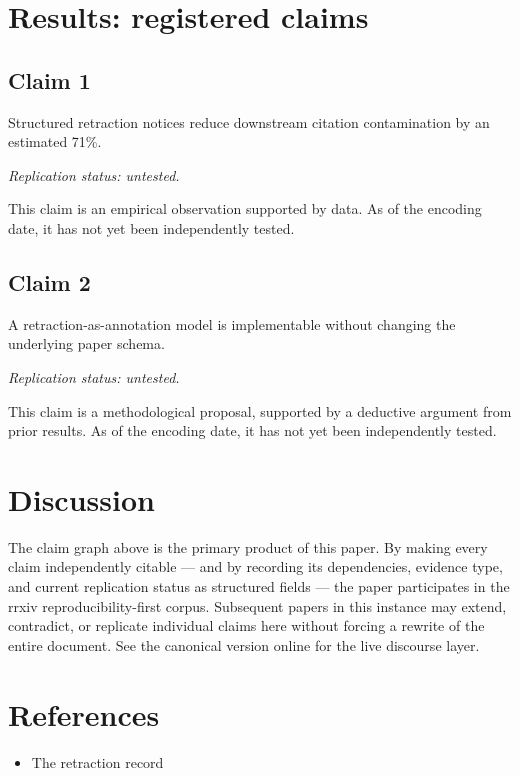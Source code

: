 \documentclass{rrxiv}
\begin{document}
\section{Results: registered claims}
\subsection*{Claim 1}
\begin{claim}[Claim 1]
\label{claim:c1}
Structured retraction notices reduce downstream citation contamination by an estimated 71\%.

\emph{Replication status: untested.}
\end{claim}
This claim is an empirical observation supported by data. As of the encoding date, it has not yet been independently tested.

\subsection*{Claim 2}
\begin{claim}[Claim 2]
\label{claim:c2}
A retraction-as-annotation model is implementable without changing the underlying paper schema.

\emph{Replication status: untested.}
\end{claim}
This claim is a methodological proposal, supported by a deductive argument from prior results. As of the encoding date, it has not yet been independently tested.

\section{Discussion}
The claim graph above is the primary product of this paper. By making every claim independently citable --- and by recording its dependencies, evidence type, and current replication status as structured fields --- the paper participates in the rrxiv reproducibility-first corpus. Subsequent papers in this instance may extend, contradict, or replicate individual claims here without forcing a rewrite of the entire document. See the canonical version online for the live discourse layer.

\section{References}
\begin{itemize}[leftmargin=*]
\item The retraction record
\end{itemize}
\end{document}
